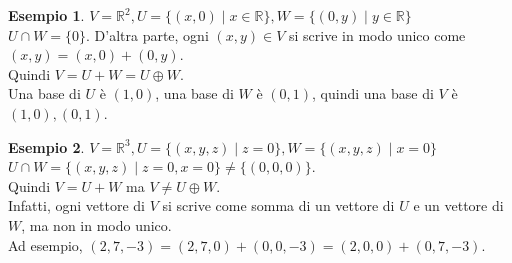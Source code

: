 \documentclass[a4paper]{article}
\theoremstyle{definition}
\newtheorem*{es}{Esempio}
\begin{document}
\begin{es}
	$V = \mathbb{R}^2, U = \{(x, 0) \mid x \in \mathbb{R}\}, W = \{(0, y) \mid y \in \mathbb{R}\}$ \\
	$U \cap W = \{0\}$. D'altra parte, ogni $(x, y) \in V$ si scrive in modo unico come $(x, y) = (x, 0) + (0, y)$. \\
	Quindi $V = U + W = U \oplus W$. \\
	Una base di $U$ è $(1, 0)$, una base di $W$ è $(0, 1)$, quindi una base di $V$ è $(1, 0), (0, 1)$.
\end{es}

\begin{es}
	$V = \mathbb{R}^3, U = \{(x, y, z) \mid z = 0\}, W = \{(x, y, z) \mid x = 0\}$ \\
	$U \cap W = \{(x, y, z) \mid z = 0, x = 0\} \ne \{(0, 0, 0)\}$. \\
	Quindi $V = U + W$ ma $V \ne U \oplus W$. \\
	Infatti, ogni vettore di $V$ si scrive come somma di un vettore di $U$ e un vettore di $W$, ma non in modo unico. \\
	Ad esempio, $(2, 7, -3) = (2, 7, 0) + (0, 0, -3) = (2, 0, 0) + (0, 7, -3)$.
\end{es}
\end{document}
